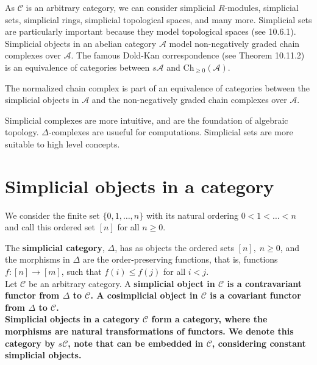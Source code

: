 As $\mathcal{C}$ is an arbitrary category, we can consider simplicial $R$-modules, simplicial sets, simplicial rings, simplicial topological spaces, and many more. Simplicial sets are particularly important because they model topological spaces (see 10.6.1). Simplicial objects in an abelian category $\mathcal{A}$ model non-negatively graded chain complexes over $\mathcal{A}$. The famous Dold-Kan correspondence (see Theorem 10.11.2) is an equivalence of categories between $s \mathcal{A}$ and $\mathrm{Ch}_{\geq 0}(\mathcal{A})$.

\begin{theo}
The normalized chain complex is part of an equivalence of categories between the simplicial objects in $\mathcal{A}$ and the non-negatively graded chain complexes over $\mathcal{A}$.   
\end{theo}

Simplicial complexes are more intuitive, and are the foundation of algebraic topology. $\Delta$-complexes are usueful for computations. Simplicial sets are more suitable to high level concepts.

\section{Simplicial objects in a category}

We consider the finite set $\{0,1, \ldots, n\}$ with its natural ordering $0<1<\ldots<n$ and call this ordered set $[n]$ for all $n \geq 0$. 

The \textbf{simplicial category}, $\Delta$, has as objects the ordered sets $[n], \; n \geq 0$, and the morphisms in $\Delta$ are the order-preserving functions, that is, functions $f:[n] \rightarrow[m]$, such that $f(i) \leq f(j)$ for all $i<j$.\\
Let $\mathcal{C}$ be an arbitrary category. A \bf{simplicial object} in $\mathcal{C}$ is a contravariant functor from $\Delta$ to $\mathcal{C}$. A cosimplicial object in $\mathcal{C}$ is a covariant functor from $\Delta$ to $\mathcal{C}$.\\
Simplicial objects in a category $\mathcal{C}$ form a category, where the morphisms are natural transformations of functors. We denote this category by $s \mathcal{C}$, note that \cc can be embedded in $\mathcal{C}$, considering constant simplicial objects.\\




